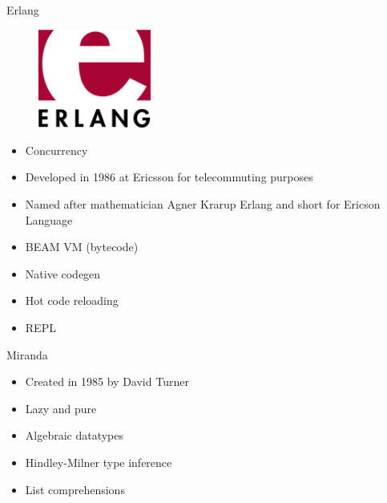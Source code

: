 \documentclass[pdf]{beamer}
\begin{document}
\begin{frame}{Erlang}
  \begin{figure}[H]
    \centering
    \includegraphics[width=0.33\textwidth]{Erlang}
  \end{figure}
  \begin{itemize}
  \item Concurrency
  \item Developed in 1986 at Ericsson for telecommuting purposes
  \item Named after mathematician Agner Krarup Erlang and short for Ericson Language
  \item BEAM VM (bytecode)
  \item Native codegen
  \item Hot code reloading
  \item REPL
  \end{itemize}
\end{frame}

\begin{frame}{Miranda}
  \begin{figure}[H]
    \centering
    \hspace{0.3cm}
  \end{figure}
  \begin{itemize}
  \item Created in 1985 by David Turner
  \item Lazy and pure
  \item Algebraic datatypes
  \item Hindley-Milner type inference
  \item List comprehensions
  \end{itemize}
\end{frame}
\end{document}
